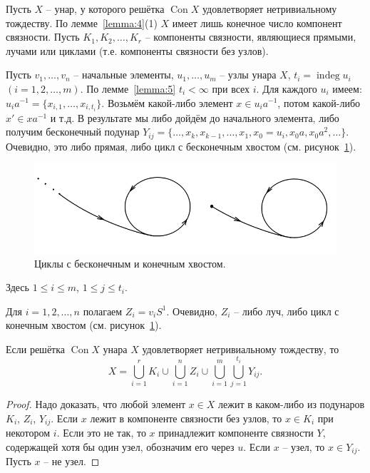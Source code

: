 \documentclass[11pt,twoside,final
]{article}
\def\Con{\operatorname{Con}}
\def\indeg{\operatorname{indeg}}
\begin{document}
Пусть $X$ -- унар, у которого решётка $\Con X$ удовлетворяет нетривиальному тождеству.
По лемме~\ref{lemma:4}(1) $X$ имеет лишь конечное число компонент связности.
Пусть $K_1, K_2, \ldots, K_r$ -- компоненты связности, являющиеся прямыми, лучами или циклами (т.е. компоненты связности без узлов).

Пусть $v_1, \ldots, v_n$ -- начальные элементы, $u_1, \ldots, u_m$ -- узлы унара $X$, $t_i = \indeg u_i$ $(i = 1,2,\ldots, m)$.
По лемме~\ref{lemma:5} $t_i < \infty$ при всех $i$.
Для каждого $u_i$ имеем: $u_i a^{-1} = \{ x_{i,1}, \ldots, x_{i, t_i} \}$.
Возьмём какой-либо элемент $x \in u_i a^{-1}$, потом какой-либо $x' \in xa^{-1}$ и т.д.
В результате мы либо дойдём до начального элемента, либо получим бесконечный подунар $Y_{ij} = \{ \ldots, x_k, x_{k -1}, \ldots, x_1, x_0 = u_i, x_0 a, x_0 a^2, \ldots \}$.
Очевидно, это либо прямая, либо цикл с бесконечным хвостом (см. рисунок~\ref{fig:cycles}).
\begin{figure}[ht!]
	\centering
	\includegraphics[scale=0.5]{img/cycles.png}
	\caption{Циклы с бесконечным и конечным хвостом.}
	\label{fig:cycles}
\end{figure}
Здесь $1 \leqslant i \leqslant m$, $1 \leqslant j \leqslant t_i$.

Для $i = 1,2, \ldots, n$ полагаем $Z_i = v_i S^1$.
Очевидно, $Z_i$ -- либо луч, либо цикл с конечным хвостом (см. рисунок~\ref{fig:cycles}).

\begin{lemma} \label{lemma:8}
	Если решётка $\Con X$ унара $X$ удовлетворяет нетривиальному тождеству, то
	\[
		X = \bigcup_{i=1}^{r} K_i \cup \bigcup_{i=1}^{n} Z_i \cup \bigcup_{i=1}^{m} \bigcup_{j=1}^{t_i} Y_{ij}.
	\]
\end{lemma}
\begin{proof}
	Надо доказать, что любой элемент $x \in X$ лежит в каком-либо из подунаров $K_i$, $Z_i$, $Y_{ij}$.
	Если $x$ лежит в компоненте связности без узлов, то $x \in K_i$ при некотором $i$.
	Если это не так, то $x$ принадлежит компоненте связности $Y$, содержащей хотя бы один узел, обозначим его через $u$.
	Если $x$ -- узел, то $x \in Y_{ij}$.
	Пусть $x$ -- не узел.
\end{proof}
\end{document}
